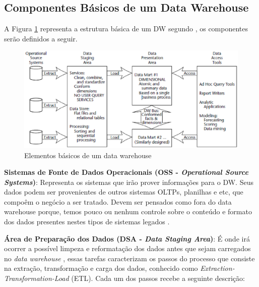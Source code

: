 \subsection{Componentes Básicos de um Data Warehouse}

A Figura \ref{fig:elem-bas-dw} representa a estrutura básica de um DW segundo , os componentes serão definidos a seguir.

\begin{figure}[h!]
\centering
\includegraphics[keepaspectratio=false,scale=0.71]{figuras/figuras_pedro/elem-bas-dw.eps}
\caption{Elementos básicos de um data warehouse}
\label{fig:elem-bas-dw}
\end{figure}
\FloatBarrier

\textbf{Sistemas de Fonte de Dados Operacionais (OSS - \textit{Operational Source Systems})}:
Representa os sistemas que irão prover informações para o DW. Seus dados podem ser provenientes de outros sistemas OLTPs, planilhas e etc, que compoêm o negócio a ser tratado. Devem ser pensados como fora do data warehouse porque, temos pouco ou nenhum controle sobre o conteúdo e formato dos dados presentes nestes tipos de sistemas legados \cite{Kimball2002}.

\textbf{Área de Preparação dos Dados (DSA - \textit{Data Staging Area})}:
É onde irá ocorrer a possível limpeza e reformatação dos dados antes que sejam carregados no \textit{data warehouse} \cite{elmasri_sistemas_2011}, essas tarefas caracterizam os passos do processo que consiste na extração, transformação e carga dos dados, conhecido como \textit{Extraction-Transformation-Load} (ETL). Cada um dos passos recebe a seguinte descrição:

